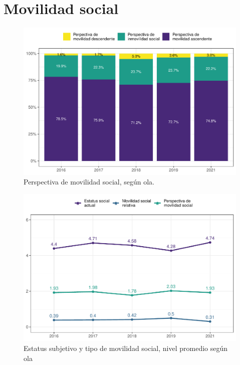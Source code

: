 \documentclass[
  12pt,
  openany]{book}
\begin{document}
\hypertarget{movilidad-social}{%
\section{Movilidad social}\label{movilidad-social}}

\begin{figure}

{\centering \includegraphics{reporte-elsoc_files/figure-latex/mov-soc-rec-1} 

}

\caption{Perspectiva de movilidad social, según ola. }\label{fig:mov-soc-rec}
\end{figure}

\begin{figure}

{\centering \includegraphics{reporte-elsoc_files/figure-latex/mov-soc-1} 

}

\caption{Estatus subjetivo y tipo de movilidad social, nivel promedio según ola}\label{fig:mov-soc}
\end{figure}
\end{document}
